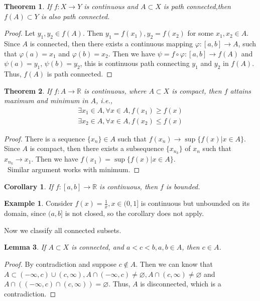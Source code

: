 \documentclass[12pt,leqno]{amsart}
\newtheorem{theorem}{Theorem}[section]
\newtheorem{corollary}{Corollary}[theorem]
\newtheorem{lemma}[theorem]{Lemma}
\theoremstyle{definition}
\newtheorem{example}{Example}[section]
\numberwithin{equation}{subsection}
\begin{document}
\begin{theorem}
If $f:X\to Y$ is continuous and $A\subset X$ is path connected,then $f(A)\subset Y$ is also path connected.
\end{theorem}
\begin{proof}
Let $y_1, y_2\in f(A)$. Then $y_1 = f(x_1), y_2 = f(x_2)$ for some $x_1, x_2\in A$. Since $A$ is connected, then there exists a continuous mapping $\varphi:[a,b]\to A$, such that $\varphi(a) = x_1$ and $\varphi(b) = x_2$. Then we have $\psi = f\circ \varphi: [a,b]\to f(A)$ and $\psi(a) = y_1$, $\psi(b) = y_2$, this is continuous path connecting $y_1$ and $y_2$ in $f(A)$. Thus, $f(A)$ is path connected.
\end{proof}

\begin{theorem}
If $f:A\to \mathbb{R}$ is continuous, where $A\subset X$ is compact, then $f$ attains maximum and minimum in $A$, i.e.,
\begin{align*}
    \exists x_1\in A, \forall x\in A, f(x_1)\geq f(x) \\
    \exists x_2\in A, \forall x\in A, f(x_2)\leq f(x)
\end{align*}
\end{theorem}
\begin{proof}
There is a sequence $\{x_n\}\in A$ such that $f(x_n)\to \sup\{f(x)|x\in A\}$. Since $A$ is compact, then there exists a subsequence $\{x_{n_k}\}$ of $x_n$ such that $x_{n_k}\to x_1$. Then we have $f(x_1) = \sup\{f(x)|x\in A\}$. \\
\hspace*{1em}\, Similar argument works with minimum.
\end{proof}

\begin{corollary}
If $f:[a,b]\to \mathbb{R}$ is continuous, then $f$ is bounded.
\end{corollary}

\medskip

\begin{example}
Consider $f(x) = \frac{1}{x}, x\in (0,1]$ is continuous but unbounded on its domain, since $(a,b]$ is not closed, so the corollary does not apply.
\end{example}

\medskip

Now we classify all connected subsets. 

\begin{lemma}\label{inter_value_connected}
If $A\subset X$ is connected, and $a<c<b, a,b\in A$, then $c\in A$.
\end{lemma}
\begin{proof}
By contradiction and suppose $c\notin A$. Then we can know that $A\subset (-\infty,c)\cup(c,\infty), A\cap (-\infty,c)\neq\varnothing, A\cap (c,\infty)\neq\varnothing$ and $A\cap((-\infty,c)\cap(c,\infty)) = \varnothing$. Thus, $A$ is disconnected, which is a contradiction.
\end{proof}
\end{document}
